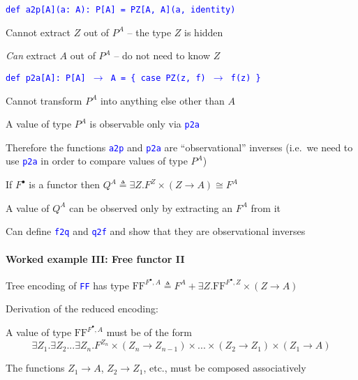 \texttt{\textcolor{blue}{\footnotesize{}def a2p{[}A{]}(a: A): P{[}A{]}
= PZ{[}A, A{]}(a, identity)}}{\footnotesize\par}

Cannot extract $Z$ out of $P^{A}$ – the type $Z$ is hidden

\emph{Can} extract $A$ out of $P^{A}$ – do not need to know $Z$

\texttt{\textcolor{blue}{\footnotesize{}def p2a{[}A{]}: P{[}A{]} $\rightarrow$
A = \{ case PZ(z, f) $\rightarrow$ f(z) \}}}{\footnotesize\par}

Cannot transform $P^{A}$ into anything else other than $A$

A value of type $P^{A}$ is observable only via \texttt{\textcolor{blue}{\footnotesize{}p2a}} 

Therefore the functions \texttt{\textcolor{blue}{\footnotesize{}a2p}}
and \texttt{\textcolor{blue}{\footnotesize{}p2a}} are \textsf{``}observational\textsf{''}
inverses (i.e.~we need to use \texttt{\textcolor{blue}{\footnotesize{}p2a}}
in order to compare values of type $P^{A}$)

If $F^{\bullet}$ is a functor then $Q^{A}\triangleq\exists Z.F^{Z}\times\left(Z\rightarrow A\right)\cong F^{A}$

A value of $Q^{A}$ can be observed only by extracting an $F^{A}$
from it

Can define \texttt{\textcolor{blue}{\footnotesize{}f2q}} and \texttt{\textcolor{blue}{\footnotesize{}q2f}}
and show that they are observational inverses


\paragraph{Worked example III: Free functor II}

Tree encoding of \texttt{\textcolor{blue}{\footnotesize{}FF}} has
type $\text{FF}^{F^{\bullet},A}\triangleq F^{A}+\exists Z.\text{FF}^{F^{\bullet},Z}\times\left(Z\rightarrow A\right)$

Derivation of the reduced encoding:

A value of type $\text{FF}^{F^{\bullet},A}$ must be of the form {\footnotesize{}
\[
\exists Z_{1}.\exists Z_{2}...\exists Z_{n}.F^{Z_{n}}\times\left(Z_{n}\rightarrow Z_{n-1}\right)\times...\times\left(Z_{2}\rightarrow Z_{1}\right)\times\left(Z_{1}\rightarrow A\right)
\]
}{\footnotesize\par}

The functions $Z_{1}\rightarrow A$, $Z_{2}\rightarrow Z_{1}$, etc.,
must be composed associatively

